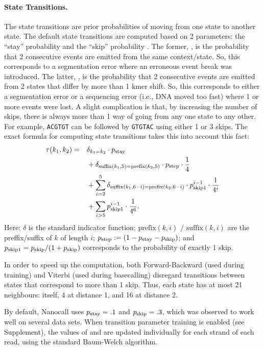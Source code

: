 \documentclass{bioinfo}
\begin{document}
\begin{methods}
\paragraph{State Transitions.}
The state transitions are prior probabilities of moving from one state to another state. The default state transitions are computed based on 2 parameters: the ``stay'' probability \pstay and the ``skip'' probability \pskip. The former, \pstay, is the probability that 2 consecutive events are emitted from the same context/state. So, this corresponds to a segmentation error where an erroneous event break was introduced. The latter, \pskip, is the probability that 2 consecutive events are emitted from 2 states that differ by more than 1 kmer shift. So, this corresponds to either a segmentation error or a sequencing error (i.e., DNA moved too fast) where 1 or more events were lost. A slight complication is that, by increasing the number of skips, there is always more than 1 way of going from any one state to any other. For example, \texttt{ACGTGT} can be followed by \texttt{GTGTAC} using either 1 or 3 skips. The exact formula for computing state transitions takes this into account this fact:
\begin{align*}
\tau(k_1, k_2) = \quad &
\delta_{k_1 = k_2} \cdot p_\mathrm{stay}
\\
& + \delta_{\mathrm{suffix}(k_1, 5) = \mathrm{prefix}(k_2, 5)} \cdot p_\mathrm{step} \cdot \frac{1}{4}
\\
& + \sum_{i=2}^5 \delta_{\mathrm{suffix}(k_1, 6-i) = \mathrm{prefix}(k_2, 6-i)} \cdot p_\mathrm{skip1}^{i-1} \cdot \frac{1}{4^i}
\\
& + \sum_{i>5} p_\mathrm{skip1}^{i-1} \cdot \frac{1}{4^6}.
\end{align*}
Here: $\delta$ is the standard indicator function; $\mathrm{prefix}(k,i)$ / $\mathrm{suffix}(k,i)$ are the preffix/suffix of $k$ of length $i$; $p_\mathrm{step} := (1 - p_\mathrm{stay} - p_\mathrm{skip})$; and $p_\mathrm{skip1} = p_\mathrm{skip} / (1 + p_\mathrm{skip})$ corresponds to the probability of exactly 1 skip.

In order to speed up the computation, both Forward-Backward (used during training) and Viterbi (used during basecalling) disregard transitions between states that correspond to more than 1 skip. Thus, each state has at most 21 neighbours: itself, 4 at distance 1, and 16 at distance 2.

By default, Nanocall uses $p_\mathrm{stay} = .1$ and $p_\mathrm{skip} = .3$, which was observed to work well on several data sets. When transition parameter training is enabled (see Supplement), the values of \pstay and \pskip are updated individually for each strand of each read, using the standard Baum-Welch algorithm.


\end{methods}
\end{document}
